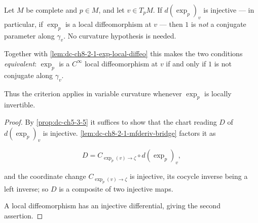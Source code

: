 \begin{lemma}
  \label{lem:dc-ch8-2-1-no-conjugate-normal}


  Let $M$ be complete and $p\in M$, and let $v\in T_pM$. If $d(\exp_p)_v$ is injective --- in
  particular, if $\exp_p$ is a local diffeomorphism at $v$ --- then $1$ is \emph{not} a conjugate
  parameter along $\gamma_v$. No curvature hypothesis is needed.

  Together with \cref{lem:dc-ch8-2-1-exp-local-diffeo} this makes the two conditions
  \emph{equivalent}: $\exp_p$ is a $C^\infty$ local diffeomorphism at $v$ if and only if $1$ is
  not conjugate along $\gamma_v$.

  Thus the criterion applies in variable curvature whenever $\exp_p$ is locally invertible.
\end{lemma}
\begin{proof}

\sketch
  By \cref{prop:dc-ch5-3-5} it suffices to show that the chart reading $D$ of $d(\exp_p)_v$ is
  injective. \cref{lem:dc-ch8-2-1-mfderiv-bridge} factors it as

  $$
  D = C_{\exp_p(v)\to\zeta}\circ d(\exp_p)_v ,
  $$

  and the coordinate change $C_{\exp_p(v)\to\zeta}$ is injective, its cocycle inverse being a left
  inverse; so $D$ is a composite of two injective maps.

  A local diffeomorphism has an injective differential, giving the second assertion.
\end{proof}

